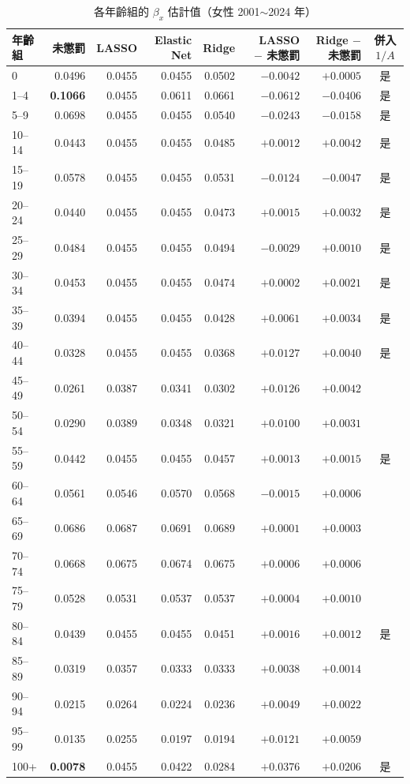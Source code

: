 \documentclass[UTF8, fontset=macnew, a4paper, 12pt]{ctexart}
\begin{document}
\begin{table}[H]
\centering
\caption{各年齡組的 $\beta_x$ 估計值（女性 2001$\sim$2024 年）}
\scriptsize
\begin{tabular}{lrrrrrrc}
\toprule
年齡組 & 未懲罰 & LASSO & Elastic Net & Ridge
& LASSO $-$ 未懲罰 & Ridge $-$ 未懲罰 & 併入 $1/A$\\
\midrule
0      & 0.0496 & 0.0455 & 0.0455 & 0.0502 & $-0.0042$ & $+0.0005$ & 是\\
1--4   & \textbf{0.1066} & 0.0455 & 0.0611 & 0.0661 & $\mathbf{-0.0612}$ & $-0.0406$ & 是\\
5--9   & 0.0698 & 0.0455 & 0.0455 & 0.0540 & $-0.0243$ & $-0.0158$ & 是\\
10--14 & 0.0443 & 0.0455 & 0.0455 & 0.0485 & $+0.0012$ & $+0.0042$ & 是\\
15--19 & 0.0578 & 0.0455 & 0.0455 & 0.0531 & $-0.0124$ & $-0.0047$ & 是\\
20--24 & 0.0440 & 0.0455 & 0.0455 & 0.0473 & $+0.0015$ & $+0.0032$ & 是\\
25--29 & 0.0484 & 0.0455 & 0.0455 & 0.0494 & $-0.0029$ & $+0.0010$ & 是\\
30--34 & 0.0453 & 0.0455 & 0.0455 & 0.0474 & $+0.0002$ & $+0.0021$ & 是\\
35--39 & 0.0394 & 0.0455 & 0.0455 & 0.0428 & $+0.0061$ & $+0.0034$ & 是\\
40--44 & 0.0328 & 0.0455 & 0.0455 & 0.0368 & $+0.0127$ & $+0.0040$ & 是\\
45--49 & 0.0261 & 0.0387 & 0.0341 & 0.0302 & $+0.0126$ & $+0.0042$ & \\
50--54 & 0.0290 & 0.0389 & 0.0348 & 0.0321 & $+0.0100$ & $+0.0031$ & \\
55--59 & 0.0442 & 0.0455 & 0.0455 & 0.0457 & $+0.0013$ & $+0.0015$ & 是\\
60--64 & 0.0561 & 0.0546 & 0.0570 & 0.0568 & $-0.0015$ & $+0.0006$ & \\
65--69 & 0.0686 & 0.0687 & 0.0691 & 0.0689 & $+0.0001$ & $+0.0003$ & \\
70--74 & 0.0668 & 0.0675 & 0.0674 & 0.0675 & $+0.0006$ & $+0.0006$ & \\
75--79 & 0.0528 & 0.0531 & 0.0537 & 0.0537 & $+0.0004$ & $+0.0010$ & \\
80--84 & 0.0439 & 0.0455 & 0.0455 & 0.0451 & $+0.0016$ & $+0.0012$ & 是\\
85--89 & 0.0319 & 0.0357 & 0.0333 & 0.0333 & $+0.0038$ & $+0.0014$ & \\
90--94 & 0.0215 & 0.0264 & 0.0224 & 0.0236 & $+0.0049$ & $+0.0022$ & \\
95--99 & 0.0135 & 0.0255 & 0.0197 & 0.0194 & $+0.0121$ & $+0.0059$ & \\
100+   & \textbf{0.0078} & 0.0455 & 0.0422 & 0.0284 & $\mathbf{+0.0376}$ & $+0.0206$ & 是\\
\bottomrule
\end{tabular}
\label{tab:appreal}
\end{table}
\end{document}
